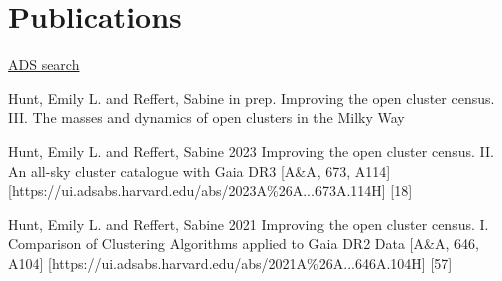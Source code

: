 \section*{Publications}

\href{\cvADSLink}{ADS search \faLink}%


\begin{etaremune}
    \item \publication
        {Hunt, Emily L. and Reffert, Sabine}
        {in prep.}
        {Improving the open cluster census. III. The masses and dynamics of open clusters in the Milky Way}
    \item \publication
        {Hunt, Emily L. and Reffert, Sabine}
        {2023}
        {Improving the open cluster census. II. An all-sky cluster catalogue with Gaia DR3}
        [A\&A, 673, A114]
        [https://ui.adsabs.harvard.edu/abs/2023A\%26A...673A.114H]
        [18]
    \item \publication
        {Hunt, Emily L. and Reffert, Sabine}
        {2021}
        {Improving the open cluster census. I. Comparison of Clustering Algorithms applied to Gaia DR2 Data}
        [A\&A, 646, A104]
        [https://ui.adsabs.harvard.edu/abs/2021A\%26A...646A.104H]
        [57]
\end{etaremune}